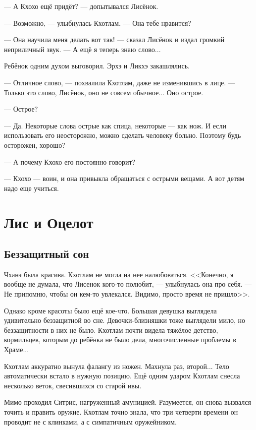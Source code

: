 --- А Кхохо ещё придёт? --- допытывался Лисёнок.

--- Возможно, --- улыбнулась Кхотлам.
--- Она тебе нравится?

--- Она научила меня делать вот так! --- сказал Лисёнок и издал громкий неприличный звук.
--- А ещё я теперь знаю слово...

Ребёнок одним духом выговорил.
Эрхэ и Ликхэ закашлялись.

--- Отличное слово, --- похвалила Кхотлам, даже не изменившись в лице.
--- Только это слово, Лисёнок, оно не совсем обычное...
Оно острое.

--- Острое?

--- Да.
Некоторые слова острые как спица, некоторые --- как нож.
И если использовать его неосторожно, можно сделать человеку больно.
Поэтому будь осторожен, хорошо?

--- А почему Кхохо его постоянно говорит?

--- Кхохо --- воин, и она привыкла обращаться с острыми вещами.
А вот детям надо еще учиться.

\chapter{Лис и Оцелот}

\section{Беззащитный сон}

Чханэ была красива.
Кхотлам не могла на нее налюбоваться.
<<Конечно, я вообще не думала, что Лисенок кого-то полюбит, --- улыбнулась она про себя.
--- Не припомню, чтобы он кем-то увлекался.
Видимо, просто время не пришло>>.

Однако кроме красоты было ещё кое-что.
Большая девушка выглядела удивительно беззащитной во сне.
Девочки-близняшки тоже выглядели мило, но беззащитности в них не было.
Кхотлам почти видела тяжёлое детство, кормильцев, которым до ребёнка не было дела, многочисленные проблемы в Храме...

\asterism

Кхотлам аккуратно вынула фалангу из ножен.
Махнула раз, второй...
Тело автоматически встало в нужную позицию.
Ещё одним ударом Кхотлам снесла несколько веток, свесившихся со старой ивы.

Мимо проходил Ситрис, нагруженный амуницией.
Разумеется, он снова вызвался точить и править оружие.
Кхотлам точно знала, что три четверти времени он проводит не с клинками, а с симпатичным оружейником.

